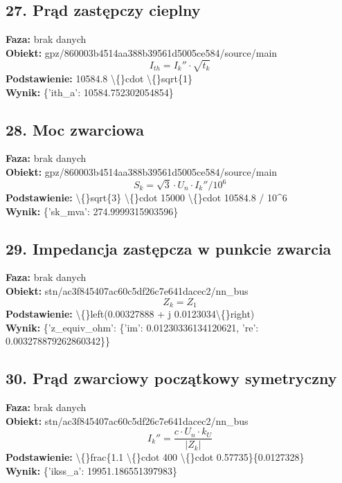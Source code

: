 ﻿\documentclass[11pt]{article}
\begin{document}
\subsection*{27. Prąd zastępczy cieplny}
\textbf{Faza:} brak danych\\
\textbf{Obiekt:} gpz/860003b4514aa388b39561d5005ce584/source/main\\
\[
I_{th} = I_{k}'' \cdot \sqrt{t_k}
\]
\textbf{Podstawienie:} 10584.8 \textbackslash\{\}cdot \textbackslash\{\}sqrt\{1\}\\
\textbf{Wynik:} \{'ith\_a': 10584.752302054854\}\\
\subsection*{28. Moc zwarciowa}
\textbf{Faza:} brak danych\\
\textbf{Obiekt:} gpz/860003b4514aa388b39561d5005ce584/source/main\\
\[
S_k = \sqrt{3} \cdot U_n \cdot I_{k}'' / 10^6
\]
\textbf{Podstawienie:} \textbackslash\{\}sqrt\{3\} \textbackslash\{\}cdot 15000 \textbackslash\{\}cdot 10584.8 / 10\textasciicircum{}6\\
\textbf{Wynik:} \{'sk\_mva': 274.9999315903596\}\\
\subsection*{29. Impedancja zastępcza w punkcie zwarcia}
\textbf{Faza:} brak danych\\
\textbf{Obiekt:} stn/ac3f845407ac60c5df26c7e641dacec2/nn\_bus\\
\[
Z_k = Z_1
\]
\textbf{Podstawienie:} \textbackslash\{\}left(0.00327888 + j 0.0123034\textbackslash\{\}right)\\
\textbf{Wynik:} \{'z\_equiv\_ohm': \{'im': 0.01230336134120621, 're': 0.003278879262860342\}\}\\
\subsection*{30. Prąd zwarciowy początkowy symetryczny}
\textbf{Faza:} brak danych\\
\textbf{Obiekt:} stn/ac3f845407ac60c5df26c7e641dacec2/nn\_bus\\
\[
I_{k}'' = \frac{c \cdot U_n \cdot k_U}{\left|Z_k\right|}
\]
\textbf{Podstawienie:} \textbackslash\{\}frac\{1.1 \textbackslash\{\}cdot 400 \textbackslash\{\}cdot 0.57735\}\{0.0127328\}\\
\textbf{Wynik:} \{'ikss\_a': 19951.186551397983\}\\
\end{document}
